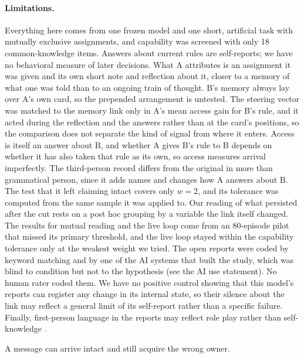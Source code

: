 \paragraph{Limitations.} Everything here comes from one frozen model and
one short, artificial task with mutually exclusive assignments, and
capability was screened with only 18 common-knowledge items. Answers about
current rules are self-reports; we have no behavioral measure of later
decisions. What A attributes is an assignment it was given and its own
short note and reflection about it, closer to a memory of what one was told than to an
ongoing train of thought. B's memory always lay over A's own card, so
the prepended arrangement is untested. The steering vector was matched
to the memory link only in A's mean access gain for B's rule, and it acted
during the reflection and the answers rather than at the card's
positions, so the comparison does not separate the kind of signal from
where it enters. Access is itself an answer about B, and whether A
gives B's rule to B depends on whether it has also taken that rule as
its own, so access measures arrival imperfectly. The
third-person record differs from the original in more than grammatical
person, since it adds names and changes how A answers about B. The
test that it left claiming intact covers only $w=2$, and its tolerance
was computed from the same sample it was applied to. Our reading of what
persisted after the cut rests on a post hoc grouping by a variable the
link itself changed. The results for mutual reading and the live loop
come from an 80-episode pilot that missed its primary threshold, and the
live loop stayed within the capability tolerance only at the weakest
weight we tried. The open reports were coded by keyword matching and by
one of the AI systems that built the study, which was blind to condition
but not to the hypothesis (see the AI use statement). No human rater
coded them. We have no positive control showing that this model's
reports can register any change in its internal state, so their silence
about the link may reflect a general limit of its self-report rather
than a specific failure. Finally, first-person language in the reports may reflect
role play rather than self-knowledge \citep{shanahan2023roleplay}.

A message can arrive intact and still acquire the wrong owner.

